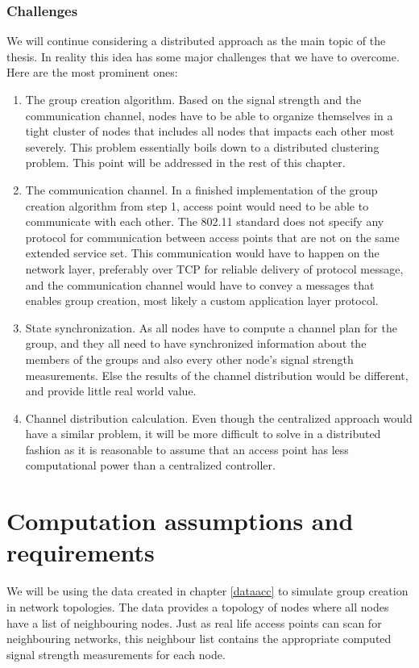 \subsubsection{Challenges}
We will continue considering a distributed approach as the main topic of the thesis. In reality this idea has some major challenges that we have to overcome. Here are the most prominent ones: 
\begin{enumerate}
	\item The group creation algorithm. Based on the signal strength and the communication channel, nodes have to be able to organize themselves in a tight cluster of nodes that
		includes all nodes that impacts each other most severely. This problem essentially boils down to a distributed clustering problem. This point will be addressed in the rest of this chapter.
	\item The communication channel. In a finished implementation of the group creation algorithm from step 1, access point would need to be able to communicate with each other.
		The 802.11 standard does not specify any protocol for communication between access points that are not on the same extended service set.
		This communication would have to happen on the network layer, preferably over TCP for reliable delivery of protocol message, and the communication channel would have to convey a messages that enables group creation, most likely a custom application layer protocol. 
	\item State synchronization. As all nodes have to compute a channel plan for the group, and they all need to have synchronized information about the members of the groups
		and also every other node's signal strength measurements. Else the results of the channel distribution would be different, and provide little real world value. 
	\item Channel distribution calculation. Even though the centralized approach would have a similar problem, it will be more difficult to solve in a distributed fashion as 
		it is reasonable to assume that an access point has less computational power than a centralized controller.
\end{enumerate}


\section{Computation assumptions and requirements}
We will be using the data created in chapter \ref{dataacc} to simulate group creation in network topologies. The data provides a topology of nodes where all nodes have a list of neighbouring nodes.
Just as real life access points can scan for neighbouring networks, this neighbour list contains the appropriate computed signal strength measurements for each node.

